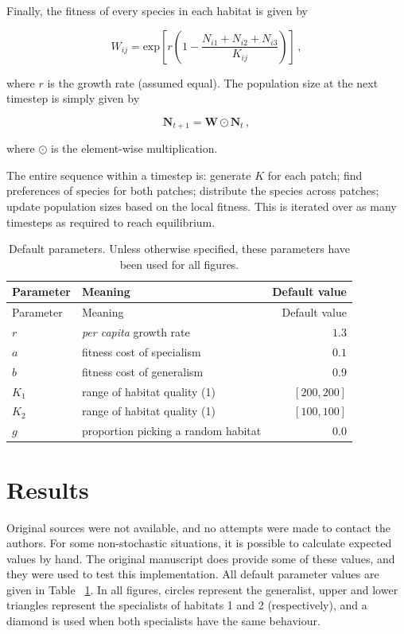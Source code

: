 \documentclass[10pt,a4paper,onecolumn]{article}
\begin{document}
Finally, the fitness of every species in each habitat is given by

\begin{equation}
W_{ij} = \text{exp}\left[r\left(1-\frac{N_{i1}+N_{i2}+N_{i3}}{K_{ij}}\right)\right] \,,
\end{equation}

where \(r\) is the growth rate (assumed equal). The population size at
the next timestep is simply given by

\begin{equation}
\mathbf{N}_{t+1} = \mathbf{W}\odot \mathbf{N}_{t} \,,
\end{equation}

where \(\odot\) is the element-wise multiplication.

The entire sequence within a timestep is: generate \(K\) for each patch;
find preferences of species for both patches; distribute the species
across patches; update population sizes based on the local fitness. This
is iterated over as many timesteps as required to reach equilibrium.

\hypertarget{tbl:prm}{}
\begin{longtable}[]{@{}llr@{}}
\caption{\label{tbl:prm}Default parameters. Unless otherwise specified,
these parameters have been used for all figures. }\tabularnewline
\toprule
Parameter & Meaning & Default value\tabularnewline
\midrule
\endfirsthead
\toprule
Parameter & Meaning & Default value\tabularnewline
\midrule
\endhead
\(r\) & \emph{per capita} growth rate & \(1.3\)\tabularnewline
\(a\) & fitness cost of specialism & \(0.1\)\tabularnewline
\(b\) & fitness cost of generalism & \(0.9\)\tabularnewline
\(K_1\) & range of habitat quality (1) & \([200,200]\)\tabularnewline
\(K_2\) & range of habitat quality (1) & \([100,100]\)\tabularnewline
\(g\) & proportion picking a random habitat & \(0.0\)\tabularnewline
\bottomrule
\end{longtable}

\hypertarget{results}{%
\section{Results}\label{results}}

Original sources were not available, and no attempts were made to
contact the authors. For some non-stochastic situations, it is possible
to calculate expected values by hand. The original manuscript does
provide some of these values, and they were used to test this
implementation. All default parameter values are given in Table
~\ref{tbl:prm}. In all figures, circles represent the generalist, upper
and lower triangles represent the specialists of habitats 1 and 2
(respectively), and a diamond is used when both specialists have the
same behaviour.
\end{document}
